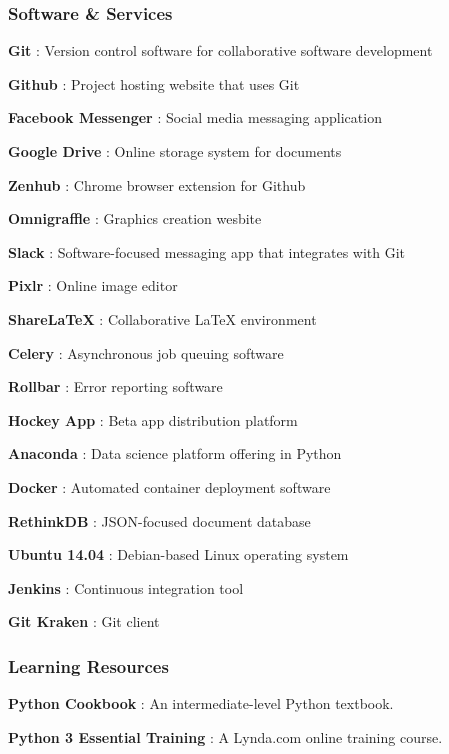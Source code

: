 \documentclass{article}
\begin{document}
\subsubsection*{Software \& Services}
\begin{itemize*}
     \item \textbf{Git} \cite{git}: Version control software for collaborative software development
     \item \textbf{Github} \cite{github}: Project hosting website that uses Git
     \item \textbf{Facebook Messenger} \cite{messenger}: Social media messaging application
     \item \textbf{Google Drive} \cite{drive}: Online storage system for documents
     \item \textbf{Zenhub} \cite{zenhub}: Chrome browser extension for Github
     \item \textbf{Omnigraffle} \cite{omnigraffle}: Graphics creation wesbite
     \item \textbf{Slack} \cite{slack}: Software-focused messaging app that integrates with Git
     \item \textbf{Pixlr} \cite{pixlr}: Online image editor
     \item \textbf{ShareLaTeX} \cite{sharelatex}: Collaborative LaTeX environment
     \item \textbf{Celery} \cite{celery}: Asynchronous job queuing software
     \item \textbf{Rollbar} \cite{rollbar}: Error reporting software
     \item \textbf{Hockey App} \cite{hockeyapp}: Beta app distribution platform
     \item \textbf{Anaconda} \cite{conda}: Data science platform offering in Python
     \item \textbf{Docker} \cite{docker}: Automated container deployment software
     \item \textbf{RethinkDB} \cite{rethinkdb}: JSON-focused document database
     \item \textbf{Ubuntu 14.04} \cite{ubuntu}: Debian-based Linux operating system
     \item \textbf{Jenkins} \cite{jenkins}: Continuous integration tool
     \item \textbf{Git Kraken} \cite{kraken}: Git client
     
\end{itemize*}

\subsubsection*{Learning Resources}
\begin{itemize*}
    \item \textbf{Python Cookbook} \cite{cookbook}: An intermediate-level Python textbook.
    \item \textbf{Python 3 Essential Training} \cite{lynda}: A Lynda.com online training course.
\end{itemize*}
\end{document}
